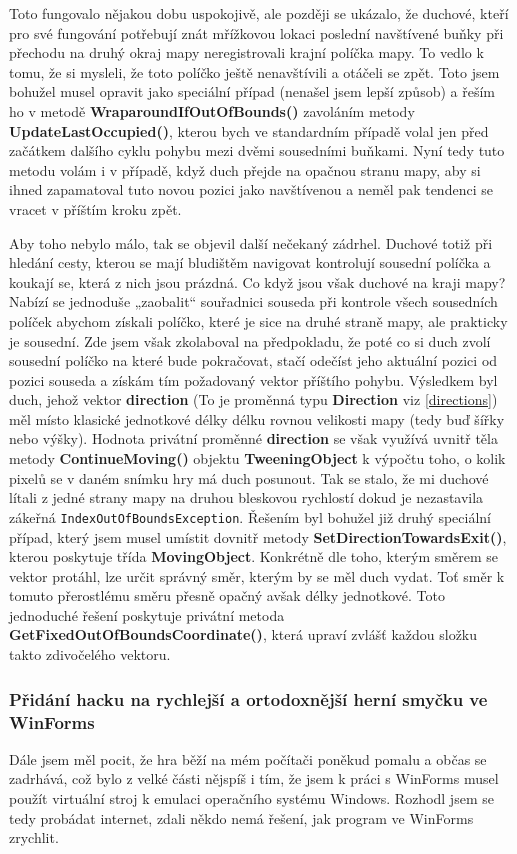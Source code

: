 \documentclass[a4]{article}
\begin{document}
Toto fungovalo nějakou dobu uspokojivě, ale později se ukázalo, že duchové, kteří pro své fungování potřebují znát mřížkovou lokaci poslední navštívené buňky při přechodu na druhý okraj mapy neregistrovali krajní políčka mapy. To vedlo k tomu, že si mysleli, že toto políčko ještě nenavštívili a otáčeli se zpět. Toto jsem bohužel musel opravit jako speciální případ (nenašel jsem lepší způsob) a řeším ho v metodě \textbf{WraparoundIfOutOfBounds()} zavoláním metody \textbf{UpdateLastOccupied()}, kterou bych ve standardním případě volal jen před začátkem dalšího cyklu pohybu mezi dvěmi sousedními buňkami. Nyní tedy tuto metodu volám i v případě, když duch přejde na opačnou stranu mapy, aby si ihned zapamatoval tuto novou pozici jako navštívenou a neměl pak tendenci se vracet v příštím kroku zpět.

Aby toho nebylo málo, tak se objevil další nečekaný zádrhel. Duchové totiž při hledání cesty, kterou se mají bludištěm navigovat kontrolují sousední políčka a koukají se, která z nich jsou prázdná. Co když jsou však duchové na kraji mapy? Nabízí se jednoduše „zaobalit“ souřadnici souseda při kontrole všech sousedních políček abychom získali políčko, které je sice na druhé straně mapy, ale prakticky je sousední. Zde jsem však zkolaboval na předpokladu, že poté co si duch zvolí sousední políčko na které bude pokračovat, stačí odečíst jeho aktuální pozici od pozici souseda a získám tím požadovaný vektor příštího pohybu. Výsledkem byl duch, jehož vektor \textbf{direction} (To je proměnná typu \textbf{Direction} viz \ref{directions}) měl místo klasické jednotkové délky délku rovnou velikosti mapy (tedy buď šířky nebo výšky). Hodnota privátní proměnné \textbf{direction} se však využívá uvnitř těla metody \textbf{ContinueMoving()} objektu \textbf{TweeningObject} k výpočtu toho, o kolik pixelů se v daném snímku hry má duch posunout. Tak se stalo, že mi duchové lítali z jedné strany mapy na druhou bleskovou rychlostí dokud je nezastavila zákeřná \verb|IndexOutOfBoundsException|. Řešením byl bohužel již druhý speciální případ, který jsem musel umístit dovnitř metody \textbf{SetDirectionTowardsExit()}, kterou poskytuje třída \textbf{MovingObject}. Konkrétně dle toho, kterým směrem se vektor protáhl, lze určit správný směr, kterým by se měl duch vydat. Toť směr k tomuto přerostlému směru přesně opačný avšak délky jednotkové. Toto jednoduché řešení poskytuje privátní metoda \textbf{GetFixedOutOfBoundsCoordinate()}, která upraví zvlášť každou složku takto zdivočelého vektoru.

\subsubsection{Přidání hacku na rychlejší a ortodoxnější herní smyčku ve WinForms} \label{gameloophack}
Dále jsem měl pocit, že hra běží na mém počítači poněkud pomalu a občas se zadrhává, což bylo z velké části nějspíš i tím, že jsem k práci s WinForms musel použít virtuální stroj k emulaci operačního systému Windows. Rozhodl jsem se tedy probádat internet, zdali někdo nemá řešení, jak program ve WinForms zrychlit. 
\end{document}

